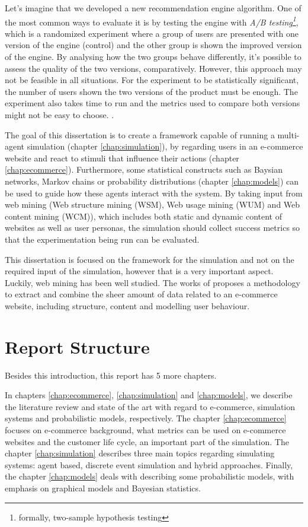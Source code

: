 Let's imagine that we developed a new recommendation engine algorithm. One of 
the most common ways to evaluate it is by testing the engine with \textit{A/B 
testing\footnote{formally, two-sample hypothesis testing}}, which is a 
randomized experiment where a group of users are presented with one version of 
the engine (control) and the other group is shown the improved version of the 
engine. By analysing how the two groups behave differently, it's possible to 
assess the quality of the two versions, comparatively. However, this approach 
may not be feasible in all situations. For the experiment to be statistically 
significant, the number of users shown the two versions of the product must be 
enough. The experiment also takes time to run and the metrics used to compare 
both versions might not be easy to choose. \cite{Quora2015}.

The goal of this dissertation is to create a framework capable of running a
multi-agent simulation (chapter \ref{chap:simulation}), by regarding users in 
an e-commerce website and react to stimuli that influence their actions 
(chapter \ref{chap:ecommerce}). Furthermore, some statistical constructs such 
as Baysian networks, Markov chains or probability distributions (chapter 
\ref{chap:models}) can be used to guide how these agents interact with the 
system. By taking input from web mining (Web structure mining (WSM), Web usage 
mining (WUM) and Web content mining (WCM)), which includes both static and 
dynamic content of websites as well as user personas, the simulation should 
collect success metrics so that the experimentation being run can be evaluated.

This dissertation is focused on the framework for the simulation and not on the 
required input of the simulation, however that is a very important aspect. 
Luckily, web mining has been well studied. The works of \cite{jpinput} proposes 
a methodology to extract and combine the sheer amount of data related to an 
e-commerce website, including structure, content and modelling user behaviour.


\section{Report Structure} \label{sec:struct}

Besides this introduction, this report has 5 more chapters.

In chapters \ref{chap:ecommerce}, \ref{chap:simulation} and \ref{chap:models}, 
we describe the literature review and state of the art with regard to 
e-commerce, 
simulation systems and probabilistic models, respectively. The chapter 
\ref{chap:ecommerce} focuses on e-commerce background, what metrics can be used 
on e-commerce websites and the customer life cycle, an important part of the 
simulation. The chapter \ref{chap:simulation} describes three main topics 
regarding simulating systems: agent based, discrete event simulation and 
hybrid approaches. Finally, the chapter \ref{chap:models} deals with describing 
some probabilistic models, with emphasis on graphical models and Bayesian 
statistics.

